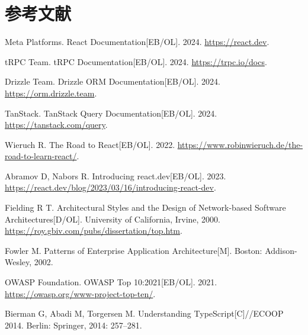\documentclass[12pt,a4paper]{ctexart}
\begin{document}
\section*{参考文献}
\begin{enumerate}[label={[\arabic*]}]
  \item Meta Platforms. React Documentation[EB/OL]. 2024. \url{https://react.dev}.
  \item tRPC Team. tRPC Documentation[EB/OL]. 2024. \url{https://trpc.io/docs}.
  \item Drizzle Team. Drizzle ORM Documentation[EB/OL]. 2024. \url{https://orm.drizzle.team}.
  \item TanStack. TanStack Query Documentation[EB/OL]. 2024. \url{https://tanstack.com/query}.
  \item Wieruch R. The Road to React[EB/OL]. 2022. \url{https://www.robinwieruch.de/the-road-to-learn-react/}.
  \item Abramov D, Nabors R. Introducing react.dev[EB/OL]. 2023. \url{https://react.dev/blog/2023/03/16/introducing-react-dev}.
  \item Fielding R T. Architectural Styles and the Design of Network-based Software Architectures[D/OL]. University of California, Irvine, 2000. \url{https://roy.gbiv.com/pubs/dissertation/top.htm}.
  \item Fowler M. Patterns of Enterprise Application Architecture[M]. Boston: Addison-Wesley, 2002.
  \item OWASP Foundation. OWASP Top 10:2021[EB/OL]. 2021. \url{https://owasp.org/www-project-top-ten/}.
  \item Bierman G, Abadi M, Torgersen M. Understanding TypeScript[C]//ECOOP 2014. Berlin: Springer, 2014: 257--281.
\end{enumerate}
\end{document}
